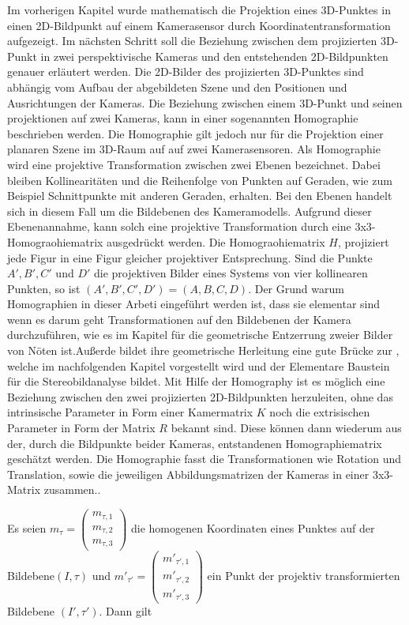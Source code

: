 Im vorherigen Kapitel wurde mathematisch die Projektion eines 3D-Punktes in einen 2D-Bildpunkt auf einem Kamerasensor durch Koordinatentransformation aufgezeigt. Im nächsten Schritt soll die Beziehung zwischen dem projizierten 3D-Punkt in zwei perspektivische Kameras und den entstehenden 2D-Bildpunkten genauer erläutert werden. Die 2D-Bilder des projizierten 3D-Punktes sind abhängig vom Aufbau der abgebildeten Szene und den Positionen und Ausrichtungen der Kameras\cite{Elements}. Die Beziehung zwischen einem 3D-Punkt und seinen projektionen auf zwei Kameras, kann in einer sogenannten Homographie beschrieben werden. Die Homographie gilt jedoch nur für die Projektion einer planaren Szene im 3D-Raum auf auf zwei Kamerasensoren. Als Homographie wird eine projektive Transformation zwischen zwei Ebenen bezeichnet. Dabei bleiben Kollinearitäten und die Reihenfolge von Punkten auf Geraden, wie zum Beispiel Schnittpunkte mit anderen Geraden, erhalten. Bei den Ebenen handelt sich in diesem Fall um die Bildebenen des Kameramodells. Aufgrund dieser Ebenenannahme, kann solch eine projektive Transformation durch eine 3x3-Homograohiematrix ausgedrückt werden\cite{Roser}. Die Homograohiematrix $H$, projiziert jede Figur in eine Figur gleicher projektiver Entsprechung\cite{HZ,Elements}. Sind die Punkte $A',B',C'$ und $D'$ die projektiven Bilder eines Systems von vier kollinearen Punkten, so ist $(A',B',C',D') = (A,B,C,D)$\cite{Peiffer}. Der Grund warum Homographien in dieser Arbeti eingeführt werden ist, dass sie elementar sind wenn es darum geht Transformationen auf den Bildebenen der Kamera durchzuführen, wie es im Kapitel  für die geometrische Entzerrung zweier Bilder von Nöten ist.Außerde bildet ihre geometrische Herleitung eine gute Brücke zur , welche im nachfolgenden Kapitel vorgestellt wird und der Elementare Baustein für die Stereobildanalyse bildet. Mit Hilfe der Homography ist es möglich eine Beziehung zwischen den zwei projizierten 2D-Bildpunkten herzuleiten, ohne das intrinsische Parameter in Form einer Kamermatrix $K$ noch die extrisischen Parameter in Form der Matrix $R$ bekannt sind\cite{HZ,Elements}.  Diese können dann wiederum aus der, durch die Bildpunkte beider Kameras, entstandenen Homographiematrix geschätzt werden\cite{HZ}. Die Homographie fasst die Transformationen wie Rotation und Translation, sowie die jeweiligen Abbildungsmatrizen der Kameras in einer 3x3-Matrix zusammen.\cite{Elements,Peiffer}. 


Es seien \ensuremath{m_{\tau} = \begin{pmatrix}
		m_{\tau,1}\\m_{\tau,2}\\m_{\tau,3}
\end{pmatrix}} die homogenen Koordinaten eines Punktes auf der Bildebene$(I,\tau)$ und \ensuremath{m'_{\tau'} = \begin{pmatrix}
m'_{\tau',1}\\m'_{\tau',2}\\m'_{\tau',3}
\end{pmatrix}} ein Punkt der projektiv transformierten Bildebene $(I',\tau')$. Dann gilt

